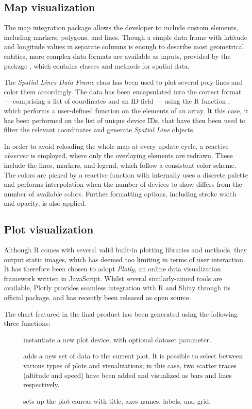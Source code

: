 \subsection{Map visualization}
The map integration package  allows the developer to include custom elements, including markers, polygons, and lines.
Though a simple data frame with latitude and longitude values in separate columns is enough to describe most geometrical entities, more complex data formats are available as inputs, provided by the package , which contains classes and methods for spatial data.

The \emph{Spatial Lines Data Frame} class has been used to plot several poly-lines and color them accordingly.
The data has been encapsulated into the correct format --- comprising a list of coordinates and an ID field --- using the R function , which performs a user-defined function on the elements of an array.
It this case, it has been performed on the list of unique device IDs, that have then been used to filter the relevant coordinates and generate \emph{Spatial Line} objects.

In order to avoid reloading the whole map at every update cycle, a reactive \emph{observer} is employed, where only the overlaying elements are redrawn.
These include the lines, markers, and legend, which follow a consistent color scheme.
The colors are picked by a reactive function with internally uses a discrete palette and performs interpolation when the number of devices to show differs from the number of available colors.
Further formatting options, including stroke width and opacity, is also applied.


\subsection{Plot visualization}
Although R comes with several valid built-in plotting libraries and methods, they output static images, which has deemed too limiting in terms of user interaction.
It has therefore been chosen to adopt \emph{Plotly}, an online data visualization framework written in JavaScript.
Whilst several similarly-aimed tools are available, Plotly provides seamless integration with R and Shiny through its official package, and has recently been released as open source.

The chart featured in the final product has been generated using the following three functions:
\begin{description}
	\item[] instantiate a new plot device, with optional dataset parameter.
	\item[] adds a new set of data to the current plot. It is possible to select between various types of plots and visualizations; in this case, two scatter traces (altitude and speed) have been added and visualized as bars and lines respectively.
	\item[] sets up the plot canvas with title, axes names, labels, and grid.
\end{description}
